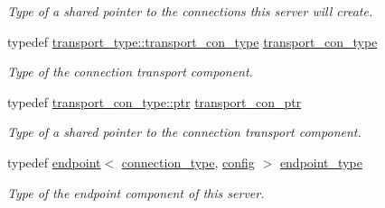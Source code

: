 \begin{DoxyCompactItemize}
\begin{DoxyCompactList}\small\item\em Type of a shared pointer to the connections this server will create. \end{DoxyCompactList}\item 
typedef \hyperlink{classwebsocketpp_1_1transport_1_1asio_1_1endpoint_a75f3102766fd3ba8230e99a2b0e00457}{transport\+\_\+type\+::transport\+\_\+con\+\_\+type} \hyperlink{classwebsocketpp_1_1client_af990a5c874d701129894f5cc88b69507}{transport\+\_\+con\+\_\+type}\hypertarget{classwebsocketpp_1_1client_af990a5c874d701129894f5cc88b69507}{}\label{classwebsocketpp_1_1client_af990a5c874d701129894f5cc88b69507}

\begin{DoxyCompactList}\small\item\em Type of the connection transport component. \end{DoxyCompactList}\item 
typedef \hyperlink{classwebsocketpp_1_1transport_1_1asio_1_1connection_aa6f25556860a154c4dacb4dac1dce8e4}{transport\+\_\+con\+\_\+type\+::ptr} \hyperlink{classwebsocketpp_1_1client_a6087b4e73f1864c893e16b33017b2da6}{transport\+\_\+con\+\_\+ptr}\hypertarget{classwebsocketpp_1_1client_a6087b4e73f1864c893e16b33017b2da6}{}\label{classwebsocketpp_1_1client_a6087b4e73f1864c893e16b33017b2da6}

\begin{DoxyCompactList}\small\item\em Type of a shared pointer to the connection transport component. \end{DoxyCompactList}\item 
typedef \hyperlink{classwebsocketpp_1_1endpoint}{endpoint}$<$ \hyperlink{classwebsocketpp_1_1client_a29c9f0410ed33a331faac19f8efea874}{connection\+\_\+type}, \hyperlink{classconfig}{config} $>$ \hyperlink{classwebsocketpp_1_1client_a37e4950ce23369e6614c28612b7ef0b4}{endpoint\+\_\+type}\hypertarget{classwebsocketpp_1_1client_a37e4950ce23369e6614c28612b7ef0b4}{}\label{classwebsocketpp_1_1client_a37e4950ce23369e6614c28612b7ef0b4}

\begin{DoxyCompactList}\small\item\em Type of the endpoint component of this server. \end{DoxyCompactList}\end{DoxyCompactItemize}

